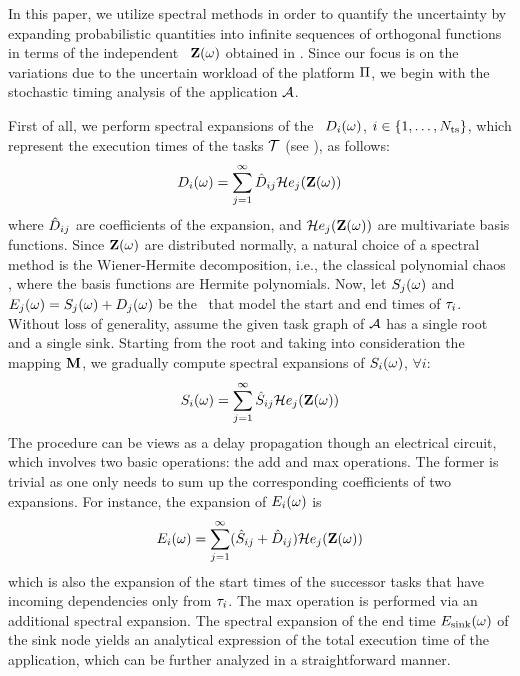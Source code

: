 In this paper, we utilize spectral methods in order to quantify the uncertainty by expanding probabilistic quantities into infinite sequences of orthogonal functions in terms of the independent \rvs\ $\mathbf{Z}(\omega)$ obtained in . Since our focus is on the variations due to the uncertain workload of the platform $\Pi$, we begin with the stochastic timing analysis of the application $\mathcal{A}$.

First of all, we perform spectral expansions of the \rvs\ $D_i(\omega)$, $i \in \{ 1, \dots, {N_\text{ts}} \}$, which represent the execution times of the tasks $\mathcal{T}$ (see ), as follows:
\[
  D_i(\omega) = \sum_{j = 1}^\infty \hat{D}_{ij} \mathcal{H}e_j(\mathbf{Z}(\omega))
\]
where $\hat{D}_{ij}$ are coefficients of the expansion, and $\mathcal{H}e_j(\mathbf{Z}(\omega))$ are multivariate basis functions. Since $\mathbf{Z}(\omega)$ are distributed normally, a natural choice of a spectral method is the Wiener-Hermite decomposition, i.e., the classical polynomial chaos \cite{ghanem2003}, where the basis functions are Hermite polynomials. Now, let $S_j(\omega)$ and $E_j(\omega) = S_j(\omega) + D_j(\omega)$ be the \rvs\ that model the start and end times of $\tau_i$. Without loss of generality, assume the given task graph of $\mathcal{A}$ has a single root and a single sink. Starting from the root and taking into consideration the mapping $\mathbf{M}$, we gradually compute spectral expansions of $S_i(\omega)$, $\forall i$:
\[
  S_i(\omega) = \sum_{j = 1}^\infty \hat{S}_{ij} \mathcal{H}e_j(\mathbf{Z}(\omega))
\]
The procedure can be views as a delay propagation though an electrical circuit, which involves two basic operations: the add and max operations. The former is trivial as one only needs to sum up the corresponding coefficients of two expansions. For instance, the expansion of $E_i(\omega)$ is
\[
  E_i(\omega) = \sum_{j = 1}^\infty (\hat{S}_{ij} + \hat{D}_{ij}) \mathcal{H}e_j(\mathbf{Z}(\omega))
\]
which is also the expansion of the start times of the successor tasks that have incoming dependencies only from $\tau_i$. The max operation is performed via an additional spectral expansion. The spectral expansion of the end time $E_\text{sink}(\omega)$ of the sink node yields an analytical expression of the total execution time of the application, which can be further analyzed in a straightforward manner.
